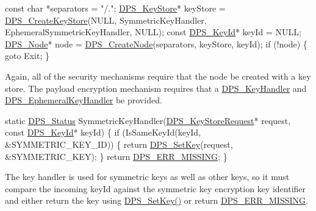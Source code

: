 \begin{DoxyCodeInclude}
    \textcolor{keyword}{const} \textcolor{keywordtype}{char} *separators = \textcolor{stringliteral}{"/."};
    \hyperlink{group__keystore_gaf3833cfe48f848f698514bc5daa075fa}{DPS\_KeyStore}* keyStore = \hyperlink{group__keystore_gafa79de23848ff56d0cced67897313369}{DPS\_CreateKeyStore}(NULL, SymmetricKeyHandler, 
      EphemeralSymmetricKeyHandler, NULL);
    \textcolor{keyword}{const} \hyperlink{struct___d_p_s___key_id}{DPS\_KeyId}* keyId = NULL;
    \hyperlink{group__node_ga4dd612ab965134321bb57fdb065f121c}{DPS\_Node}* node = \hyperlink{group__node_gaf6641b5bbf27b2c45ac7f926b0ce4efe}{DPS\_CreateNode}(separators, keyStore, keyId);
    \textcolor{keywordflow}{if} (!node) \{
        \textcolor{keywordflow}{goto} Exit;
    \}
\end{DoxyCodeInclude}
Again, all of the security mechanisms require that the node be created with a key store. The payload encryption mechanism requires that a \hyperlink{group__keystore_gaccf7e3d43bc1e586132d7f1ae03d02f7}{D\+P\+S\+\_\+\+Key\+Handler} and \hyperlink{group__keystore_ga5b4cf102912eea802196d3e307c399ef}{D\+P\+S\+\_\+\+Ephemeral\+Key\+Handler} be provided.


\begin{DoxyCodeInclude}
\textcolor{keyword}{static} \hyperlink{group__status_ga30395a84d3cad9d4ec29848106415038}{DPS\_Status} SymmetricKeyHandler(\hyperlink{group__keystore_ga7c3e50965b65334e9791780fa855ed16}{DPS\_KeyStoreRequest}* request, \textcolor{keyword}{const} 
      \hyperlink{struct___d_p_s___key_id}{DPS\_KeyId}* keyId)
\{
    \textcolor{keywordflow}{if} (IsSameKeyId(keyId, &SYMMETRIC\_KEY\_ID)) \{
        \textcolor{keywordflow}{return} \hyperlink{group__keystore_ga15d6a9b8256b67c2ec8b1d365a98dbab}{DPS\_SetKey}(request, &SYMMETRIC\_KEY);
    \}
    \textcolor{keywordflow}{return} \hyperlink{group__status_ga5c46980c33492a8b76bffce081dbcba4}{DPS\_ERR\_MISSING};
\}
\end{DoxyCodeInclude}
The key handler is used for symmetric keys as well as other keys, so it must compare the incoming {\ttfamily key\+Id} against the symmetric key encryption key identifier and either return the key using \hyperlink{group__keystore_ga15d6a9b8256b67c2ec8b1d365a98dbab}{D\+P\+S\+\_\+\+Set\+Key()} or return \hyperlink{group__status_ga5c46980c33492a8b76bffce081dbcba4}{D\+P\+S\+\_\+\+E\+R\+R\+\_\+\+M\+I\+S\+S\+I\+NG}.


